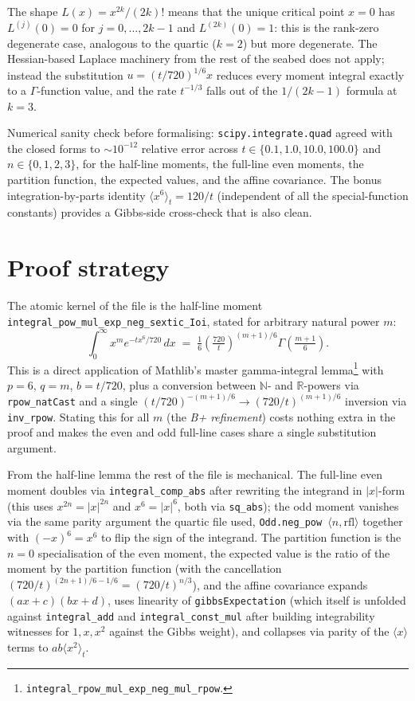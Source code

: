 \documentclass[11pt]{article}
\begin{document}
The shape $L(x) = x^{2k}/(2k)!$ means that the unique critical point
$x = 0$ has $L^{(j)}(0) = 0$ for $j = 0, \dots, 2k-1$ and
$L^{(2k)}(0) = 1$: this is the rank-zero degenerate case,
analogous to the quartic ($k=2$) but more degenerate. The Hessian-based
Laplace machinery from the rest of the seabed does not apply; instead the
substitution $u = (t/720)^{1/6} x$ reduces every moment integral exactly
to a $\Gamma$-function value, and the rate $t^{-1/3}$ falls out of the
$1/(2k-1)$ formula at $k=3$.

Numerical sanity check before formalising: \texttt{scipy.integrate.quad}
agreed with the closed forms to $\sim 10^{-12}$ relative error across
$t \in \{0.1, 1.0, 10.0, 100.0\}$ and $n \in \{0,1,2,3\}$, for the half-line
moments, the full-line even moments, the partition function, the expected
values, and the affine covariance. The bonus integration-by-parts identity
$\langle x^6\rangle_t = 120/t$ (independent of all the special-function
constants) provides a Gibbs-side cross-check that is also clean.

\section{Proof strategy}

The atomic kernel of the file is the half-line moment
\texttt{integral\_pow\_mul\_exp\_neg\_sextic\_Ioi}, stated for arbitrary
natural power $m$:
\[
  \int_0^\infty x^m e^{-t x^6 / 720}\,dx
  \;=\; \tfrac{1}{6} \left(\tfrac{720}{t}\right)^{(m+1)/6}
        \Gamma\!\left(\tfrac{m+1}{6}\right).
\]
This is a direct application of Mathlib's master gamma-integral
lemma\footnote{\texttt{integral\_rpow\_mul\_exp\_neg\_mul\_rpow}.} with
$p = 6$, $q = m$, $b = t/720$, plus a conversion between $\mathbb{N}$- and
$\mathbb{R}$-powers via \texttt{rpow\_natCast} and a single
$(t/720)^{-(m+1)/6} \to (720/t)^{(m+1)/6}$ inversion via \texttt{inv\_rpow}.
Stating this for all $m$ (the \emph{B+ refinement}) costs nothing extra in
the proof and makes the even and odd full-line cases share a single
substitution argument.

From the half-line lemma the rest of the file is mechanical. The full-line
even moment doubles via \texttt{integral\_comp\_abs} after rewriting the
integrand in $|x|$-form (this uses
$x^{2n} = |x|^{2n}$ and $x^6 = |x|^6$, both via \texttt{sq\_abs}); the odd
moment vanishes via the same parity argument the quartic file used,
\texttt{Odd.neg\_pow $\langle n,\text{rfl}\rangle$} together with
$(-x)^6 = x^6$ to flip the sign of the integrand. The partition function is
the $n=0$ specialisation of the even moment, the expected value is the
ratio of the moment by the partition function (with the cancellation
$(720/t)^{(2n+1)/6 - 1/6} = (720/t)^{n/3}$), and the affine covariance
expands $(ax+c)(bx+d)$, uses linearity of \texttt{gibbsExpectation} (which
itself is unfolded against \texttt{integral\_add} and
\texttt{integral\_const\_mul} after building integrability witnesses for
$1, x, x^2$ against the Gibbs weight), and collapses via parity of the
$\langle x\rangle$ terms to $ab \langle x^2\rangle_t$.
\end{document}
